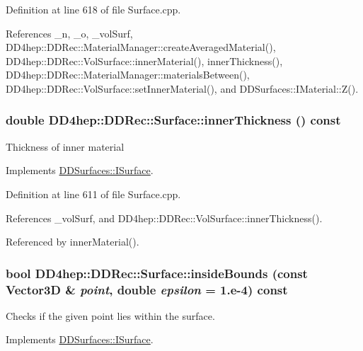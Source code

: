 Definition at line 618 of file Surface.cpp.

References \_\-n, \_\-o, \_\-volSurf, DD4hep::DDRec::MaterialManager::createAveragedMaterial(), DD4hep::DDRec::VolSurface::innerMaterial(), innerThickness(), DD4hep::DDRec::MaterialManager::materialsBetween(), DD4hep::DDRec::VolSurface::setInnerMaterial(), and DDSurfaces::IMaterial::Z().\hypertarget{class_d_d4hep_1_1_d_d_rec_1_1_surface_a4efd4a2e74c6435916cef09328cc436c}{
\subsubsection[{innerThickness}]{\setlength{\rightskip}{0pt plus 5cm}double DD4hep::DDRec::Surface::innerThickness () const}}
\label{class_d_d4hep_1_1_d_d_rec_1_1_surface_a4efd4a2e74c6435916cef09328cc436c}
Thickness of inner material 

Implements \hyperlink{class_d_d_surfaces_1_1_i_surface_ab6913582dd6c1f44df2038705ce2aea6}{DDSurfaces::ISurface}.

Definition at line 611 of file Surface.cpp.

References \_\-volSurf, and DD4hep::DDRec::VolSurface::innerThickness().

Referenced by innerMaterial().\hypertarget{class_d_d4hep_1_1_d_d_rec_1_1_surface_a2a86417b353cd25ee5bc96e8cc9dff2f}{
\subsubsection[{insideBounds}]{\setlength{\rightskip}{0pt plus 5cm}bool DD4hep::DDRec::Surface::insideBounds (const {\bf Vector3D} \& {\em point}, \/  double {\em epsilon} = {\ttfamily 1.e-\/4}) const}}
\label{class_d_d4hep_1_1_d_d_rec_1_1_surface_a2a86417b353cd25ee5bc96e8cc9dff2f}


Checks if the given point lies within the surface. 

Implements \hyperlink{class_d_d_surfaces_1_1_i_surface_a16aa78cb8c01cd5993b7cf23f55a7e3a}{DDSurfaces::ISurface}.

